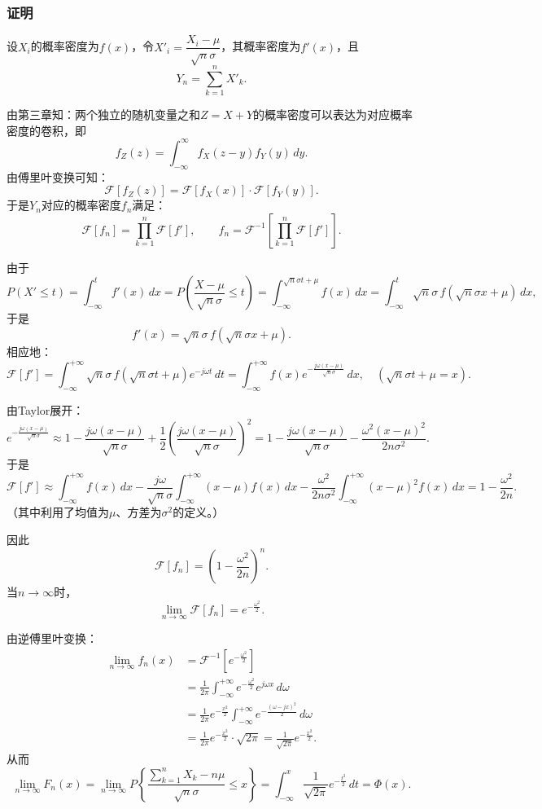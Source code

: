\documentclass[11pt,a4paper]{report}
\theoremstyle{definition}
\begin{document}
\subsubsection*{证明}

设$X_{i}$的概率密度为$f(x)$，令$X'_{i}=\dfrac{X_{i}-\mu}{\sqrt{n}\sigma}$，其概率密度为$f'(x)$，且
\[
Y_{n}=\sum_{k=1}^{n}X'_{k}.
\]

由第三章知：两个独立的随机变量之和$Z=X+Y$的概率密度可以表达为对应概率密度的卷积，即
\[
f_{Z}(z)=\int_{-\infty}^{\infty}f_{X}(z-y)f_{Y}(y)\,dy.
\]
由傅里叶变换可知：
\[
\mathcal{F}[f_{Z}(z)]=\mathcal{F}[f_{X}(x)]\cdot\mathcal{F}[f_{Y}(y)].
\]
于是$Y_{n}$对应的概率密度$f_{n}$满足：
\[
\mathcal{F}[f_{n}]=\prod_{k=1}^{n}\mathcal{F}[f'],\qquad f_{n}=\mathcal{F}^{-1}\left[\prod_{k=1}^{n}\mathcal{F}[f']\right].
\]

由于
\[
P(X'\leq t)=\int_{-\infty}^{t}f'(x)\,dx=P\left(\frac{X-\mu}{\sqrt{n}\sigma}\leq t\right)=\int_{-\infty}^{\sqrt{n}\sigma t+\mu}f(x)\,dx=\int_{-\infty}^{t}\sqrt{n}\sigma\,f(\sqrt{n}\sigma x+\mu)\,dx,
\]
于是
\[
f'(x)=\sqrt{n}\sigma\,f(\sqrt{n}\sigma x+\mu).
\]
相应地：
\[
\mathcal{F}[f']=\int_{-\infty}^{+\infty}\sqrt{n}\sigma\,f(\sqrt{n}\sigma t+\mu)e^{-j\omega t}\,dt=\int_{-\infty}^{+\infty}f(x)e^{-\frac{j\omega(x-\mu)}{\sqrt{n}\sigma}}\,dx,\quad\left(\sqrt{n}\sigma t+\mu=x\right).
\]

由Taylor展开：
\[
e^{-\frac{j\omega(x-\mu)}{\sqrt{n}\sigma}}\approx1-\frac{j\omega(x-\mu)}{\sqrt{n}\sigma}+\frac{1}{2}\left(\frac{j\omega(x-\mu)}{\sqrt{n}\sigma}\right)^{2}=1-\frac{j\omega(x-\mu)}{\sqrt{n}\sigma}-\frac{\omega^{2}(x-\mu)^{2}}{2n\sigma^{2}}.
\]
于是
\[
\mathcal{F}[f']\approx\int_{-\infty}^{+\infty}f(x)\,dx-\frac{j\omega}{\sqrt{n}\sigma}\int_{-\infty}^{+\infty}(x-\mu)f(x)\,dx-\frac{\omega^{2}}{2n\sigma^{2}}\int_{-\infty}^{+\infty}(x-\mu)^{2}f(x)\,dx=1-\frac{\omega^{2}}{2n}.
\]
（其中利用了均值为$\mu$、方差为$\sigma^{2}$的定义。）

因此
\[
\mathcal{F}[f_{n}]=\left(1-\frac{\omega^{2}}{2n}\right)^{n}.
\]
当$n\to\infty$时，
\[
\lim_{n\to\infty}\mathcal{F}[f_{n}]=e^{-\frac{\omega^{2}}{2}}.
\]

由逆傅里叶变换：
\begin{align*}
\lim_{n\to\infty}f_{n}(x)&=\mathcal{F}^{-1}\left[e^{-\frac{\omega^{2}}{2}}\right]\\
&=\frac{1}{2\pi}\int_{-\infty}^{+\infty}e^{-\frac{\omega^{2}}{2}}e^{j\omega x}\,d\omega\\
&=\frac{1}{2\pi}e^{-\frac{x^{2}}{2}}\int_{-\infty}^{+\infty}e^{-\frac{(\omega-jx)^{2}}{2}}\,d\omega\\
&=\frac{1}{2\pi}e^{-\frac{x^{2}}{2}}\cdot\sqrt{2\pi}=\frac{1}{\sqrt{2\pi}}e^{-\frac{x^{2}}{2}}.
\end{align*}
从而
\[
\lim_{n\to\infty}F_{n}(x)=\lim_{n\to\infty}P\left\{\frac{\sum_{k=1}^{n}X_{k}-n\mu}{\sqrt{n}\sigma}\leq x\right\}=\int_{-\infty}^{x}\frac{1}{\sqrt{2\pi}}e^{-\frac{t^{2}}{2}}\,dt=\Phi(x).
\]
\end{document}
